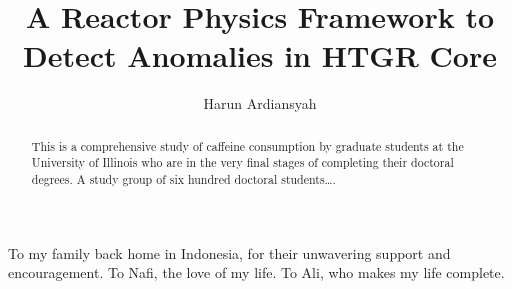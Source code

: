 \documentclass{uiucthesis2021}
\begin{document}
\title{A Reactor Physics Framework to Detect Anomalies in HTGR Core}
\author{Harun Ardiansyah}
\phdthesis
{}
\maketitle

\frontmatter



\begin{abstract}
This is a comprehensive study of caffeine consumption by graduate
students at the University of Illinois who are in the very final
stages of completing their doctoral degrees. A study group of six
hundred doctoral students\ldots.
\end{abstract}

\begin{dedication}
To my family back home in Indonesia, for their unwavering support and encouragement. To Nafi, the love of my life. To Ali, who makes my life complete.
\end{dedication}
\end{document}

